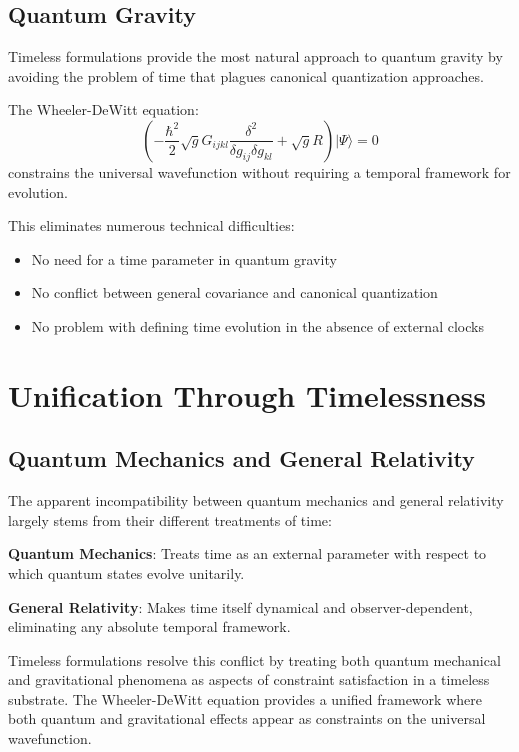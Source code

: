 \documentclass[12pt]{article}
\begin{document}
\subsection{Quantum Gravity}

Timeless formulations provide the most natural approach to quantum gravity by avoiding the problem of time that plagues canonical quantization approaches.

The Wheeler-DeWitt equation:
\begin{equation}
\left(-\frac{\hbar^2}{2}\sqrt{g}G_{ijkl}\frac{\delta^2}{\delta g_{ij}\delta g_{kl}} + \sqrt{g}R\right)|\Psi\rangle = 0
\end{equation}
constrains the universal wavefunction without requiring a temporal framework for evolution.

This eliminates numerous technical difficulties:
\begin{itemize}
\item No need for a time parameter in quantum gravity
\item No conflict between general covariance and canonical quantization
\item No problem with defining time evolution in the absence of external clocks
\end{itemize}

\section{Unification Through Timelessness}

\subsection{Quantum Mechanics and General Relativity}

The apparent incompatibility between quantum mechanics and general relativity largely stems from their different treatments of time:

\textbf{Quantum Mechanics}: Treats time as an external parameter with respect to which quantum states evolve unitarily.

\textbf{General Relativity}: Makes time itself dynamical and observer-dependent, eliminating any absolute temporal framework.

Timeless formulations resolve this conflict by treating both quantum mechanical and gravitational phenomena as aspects of constraint satisfaction in a timeless substrate. The Wheeler-DeWitt equation provides a unified framework where both quantum and gravitational effects appear as constraints on the universal wavefunction.
\end{document}
